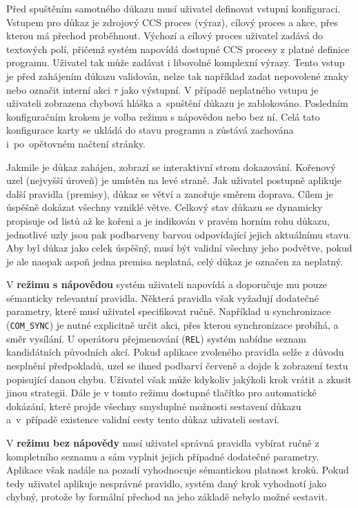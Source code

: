 Před spuštěním samotného důkazu musí uživatel definovat vstupní konfiguraci.
Vstupem pro důkaz je zdrojový CCS proces (výraz), cílový proces a akce, přes kterou má přechod proběhnout. 
Výchozí a cílový proces uživatel zadává do textových polí, přičemž systém napovídá dostupné CCS procesy z platné definice programu. 
Uživatel tak může zadávat i libovolné komplexní výrazy.
Tento vstup je před zahájením důkazu validován, nelze tak například zadat nepovolené znaky nebo označit interní akci $\tau$ jako výstupní. 
V případě neplatného vstupu je uživateli zobrazena chybová hláška a~spuštění důkazu je zablokováno.
Posledním konfiguračním krokem je volba režimu s nápovědou nebo bez ní. 
Celá tato konfigurace karty se ukládá do stavu programu a zůstává zachována i~po~opětovném načtení stránky.

Jakmile je důkaz zahájen, zobrazí se interaktivní strom dokazování. 
Kořenový uzel (nejvyšší úroveň) je umístěn na levé straně. 
Jak uživatel postupně aplikuje další pravidla (premisy), důkaz se větví a zanořuje směrem doprava. 
Cílem je úspěšně dokázat všechny vzniklé větve. 
Celkový stav důkazu se dynamicky propisuje od listů až ke kořeni a je indikován v pravém horním rohu důkazu, jednotlivé uzly jsou pak podbarveny barvou odpovídající jejich aktuálnímu stavu. 
Aby byl důkaz jako celek úspěšný, musí být validní všechny jeho podvětve, pokud je ale naopak aspoň jedna premisa neplatná, celý důkaz je označen za neplatný.

V \textbf{režimu s nápovědou} systém uživateli napovídá a doporučuje mu pouze sémanticky relevantní pravidla. 
Některá pravidla však vyžadují dodatečné parametry, které musí uživatel specifikovat ručně. 
Například u synchronizace (\texttt{COM\_SYNC}) je nutné explicitně určit akci, přes kterou synchronizace probíhá, a směr vysílání. 
U operátoru přejmenování (\texttt{REL}) systém nabídne seznam kandidátních původních akcí.
Pokud aplikace zvoleného pravidla selže z důvodu nesplnění předpokladů, uzel se ihned podbarví červeně a dojde k zobrazení textu popisující danou chybu. 
Uživatel však může kdykoliv jakýkoli krok vrátit a zkusit jinou strategii.
Dále je v tomto režimu dostupné tlačítko pro automatické dokázání, které projde všechny smysluplné možnosti sestavení důkazu a~v~případě existence validní cesty tento důkaz uživateli sestaví.

V \textbf{režimu bez nápovědy} musí uživatel správná pravidla vybírat ručně z kompletního seznamu a sám vyplnit jejich případné dodatečné parametry. 
Aplikace však nadále na pozadí vyhodnocuje sémantickou platnost kroků.
Pokud tedy uživatel aplikuje nesprávné pravidlo, systém daný krok vyhodnotí jako chybný, protože by formální přechod na jeho základě nebylo možné sestavit.

